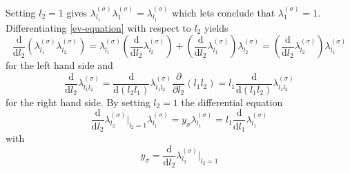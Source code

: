 	Setting $l_2 = 1$ gives $\lambda_{l_1}^{(\sigma)} \lambda_{1}^{(\sigma)} =	\lambda_{l_1}^{(\sigma)}$ which lets conclude that $\lambda_{1}^{(\sigma)} =	1$. Differentiating \autoref{ev-equation} with respect to $l_2$ yields
	\begin{equation}
		\frac{\text{d}}{\text{d}l_2} \left(\lambda_{l_1}^{(\sigma)} \lambda_{l_2}^{(\sigma)}\right) = \lambda_{l_1}^{(\sigma)}  \left(\frac{\text{d}}{\text{d}l_2} \lambda_{l_2}^{(\sigma)}\right) +  			  \left( \frac{\text{d}}{\text{d}l_2} \lambda_{l_1}^{(\sigma)}\right) \lambda_{l_2}^{(\sigma)} 	= \left(\frac{\text{d}}{\text{d}l_2} \lambda_{l_2}^{(\sigma)}\right) \lambda_{l_1}^{(\sigma)}
	\end{equation}
	for the left hand side and
	\begin{equation}
		\frac{\text{d}}{\text{d}l_2} \lambda_{l_1l_2}^{(\sigma)} =	\frac{\text{d}}{\text{d}(l_2 l_1)} \lambda_{l_1l_2}^{(\sigma)} \frac{\partial}{\partial l_2} (l_1 l_2) =	l_1 \frac{\text{d}}{\text{d}(l_1l_2)} \lambda_{l_1l_2}^{(\sigma)}
	\end{equation}
	for the right hand side. By setting $l_2 =	1$ the differential equation
	\begin{equation}\label{RG-diff}
		\frac{\text{d}}{\text{d}l_2} \lambda_{l_2}^{(\sigma)} \bigg |_{l_2 =	1} \lambda_{l_1}^{(\sigma)}  = y_\sigma \lambda_{l_1}^{(\sigma)} = l_1 \frac{\text{d}}{\text{d}l_1} \lambda_{l_1}^{(\sigma)}
	\end{equation}
	with
	\begin{equation}
		y_\sigma = \frac{\text{d}}{\text{d}l_2} \lambda_{l_2}^{(\sigma)} \bigg |_{l_2 =	1}
	\end{equation}
